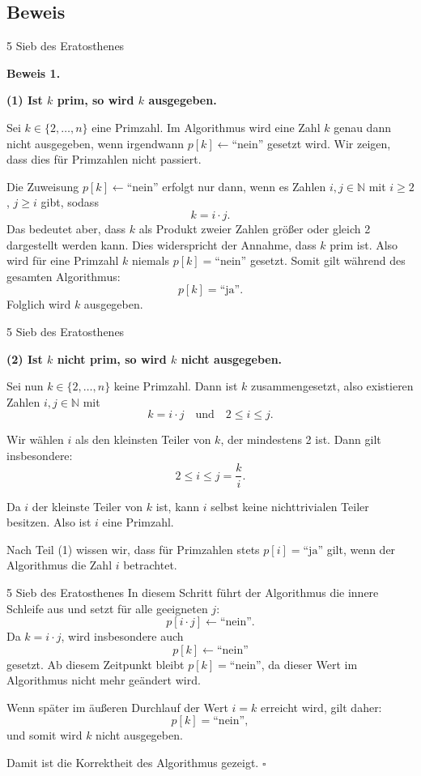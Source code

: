 \documentclass{beamer}
\begin{document}
\subsection{Beweis}
\begin{frame}{5 Sieb des Eratosthenes}

\textcolor{structure}{\textbf{Beweis 1.}}

    \textbf{(1) Ist \(k\) prim, so wird \(k\) ausgegeben.}

Sei \(k \in \{2, \dots, n\}\) eine Primzahl. Im Algorithmus wird eine Zahl \(k\) genau dann nicht ausgegeben, wenn irgendwann 
\(p[k] \leftarrow \text{``nein''}\) gesetzt wird. Wir zeigen, dass dies für Primzahlen nicht passiert.

Die Zuweisung \(p[k] \leftarrow \text{``nein''}\) erfolgt nur dann, wenn es Zahlen 
\(i, j \in \mathbb{N}\) mit \(i \ge 2\), \(j \ge i\) gibt, sodass \[k = i \cdot j.\]
Das bedeutet aber, dass \(k\) als Produkt zweier Zahlen größer oder gleich 2 dargestellt werden kann. Dies widerspricht der Annahme, dass \(k\) prim ist.
Also wird für eine Primzahl \(k\) niemals \(p[k] = \text{``nein''}\) gesetzt. Somit gilt während des gesamten Algorithmus: \[p[k] = \text{``ja''}.\] Folglich wird \(k\) ausgegeben.
\end{frame}


\begin{frame}{5 Sieb des Eratosthenes}

 \textbf{(2) Ist \(k\) nicht prim, so wird \(k\) nicht ausgegeben.}

Sei nun \(k \in \{2, \dots, n\}\) keine Primzahl. Dann ist \(k\) zusammengesetzt, 
also existieren Zahlen \(i, j \in \mathbb{N}\) mit
\[
k = i \cdot j \quad \text{und} \quad 2 \le i \le j.
\]

Wir wählen \(i\) als den kleinsten Teiler von \(k\), der mindestens 2 ist. 
Dann gilt insbesondere:
\[
2 \le i \le j = \frac{k}{i}.
\]

Da \(i\) der kleinste Teiler von \(k\) ist, kann \(i\) selbst keine nichttrivialen 
Teiler besitzen. Also ist \(i\) eine Primzahl.

Nach Teil (1) wissen wir, dass für Primzahlen stets \(p[i] = \text{``ja''}\) gilt, 
wenn der Algorithmus die Zahl \(i\) betrachtet.
    
\end{frame}


\begin{frame}{5 Sieb des Eratosthenes}
In diesem Schritt führt der Algorithmus die innere Schleife aus und setzt für alle 
geeigneten \(j\):
\[
p[i \cdot j] \leftarrow \text{``nein''}.
\]
Da \(k = i \cdot j\), wird insbesondere auch
\[
p[k] \leftarrow \text{``nein''}
\]
gesetzt.
Ab diesem Zeitpunkt bleibt \(p[k] = \text{``nein''}\), da dieser Wert im Algorithmus 
nicht mehr geändert wird.

Wenn später im äußeren Durchlauf der Wert \(i = k\) erreicht wird, gilt daher:
\[
p[k] = \text{``nein''},
\]
und somit wird \(k\) nicht ausgegeben.

\medskip

Damit ist die Korrektheit des Algorithmus gezeigt.
\hfill$\square$

\end{frame}
\end{document}
